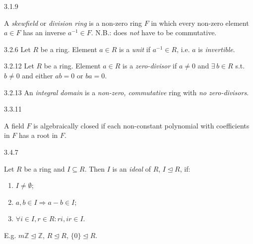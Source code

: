 \documentclass[10pt]{article} %
\begin{document}
\begin{multicols}{3}
\begin{definition}{3.1.9}{}

    A \emph{skewfield} or \emph{division ring} is a non-zero ring $F$ in which every non-zero element $a \in F$ has an inverse $a^{-1} \in F$. N.B.: does \emph{not} have to be commutative.

\end{definition}

\begin{definition}{3.2.6}{}
    Let $R$ be a ring. Element $a \in R$ is a \emph{unit} if $a^{-1} \in R$, i.e. $a$ is \emph{invertible}.
\end{definition}

\begin{definition}{3.2.12}{}
    Let $R$ be a ring. Element $a \in R$ is a \emph{zero-divisor} if $a \neq 0$ and $\exists \, b \in R$ s.t. $b \neq 0$ and either $ab = 0$ or $ba = 0$.
\end{definition}

\begin{definition}{3.2.13}{}
    An \emph{integral domain} is a \emph{non-zero, commutative} ring with \emph{no zero-divisors}.
\end{definition}

\begin{definition}{3.3.11}{}

    A field $F$ is algebraically closed if each non-constant polynomial with coefficients in $F$ has a root in $F$.

\end{definition}

\begin{definition}{3.4.7}{}

    Let $R$ be a ring and $I \subseteq R$. Then $I$ is an \emph{ideal} of $R$, $I \unlhd R$, if:

        \begin{enumerate}[(1)]
            \setlength{\parskip}{0em}
            \item $I \neq \emptyset$;
            \item $a,b \in I \Rightarrow a - b \in I$;
            \item $\forall i \in I, r \in R: ri, ir \in I$.
        \end{enumerate}

    E.g. $m\mathbb{Z} \unlhd \mathbb{Z}$, $R \unlhd R$, $\{0\} \unlhd R$.


\end{definition}
\end{multicols}
\end{document}
